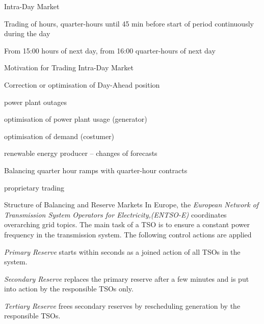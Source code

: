


{Intra-Day Market }






	Trading of hours, quarter-hours until 45 min before start of period continuously during the day


	From 15:00 hours of next day, from 16:00 quarter-hours of next day





{Motivation for Trading Intra-Day Market }






	Correction or optimisation of Day-Ahead position






	power plant outages


	optimisation of power plant usage (generator)


	optimisation of demand (costumer)


	renewable energy producer -- changes of forecasts






	Balancing quarter hour ramps with quarter-hour contracts


	proprietary trading





{Structure of Balancing and Reserve Markets }
In Europe, the {\it European Network of Transmission System Operators for Electricity,(ENTSO-E)} coordinates overarching grid topics. The main task of a TSO is to ensure a constant power frequency in the transmission system. The following control actions are applied






	{\it Primary Reserve}   starts within seconds as a joined action of all TSOs in the system.


	{\it Secondary Reserve} replaces the primary reserve after a few minutes and is put into action by the responsible TSOs only.


	{\it Tertiary Reserve} frees secondary reserves by rescheduling generation by the responsible TSOs.


